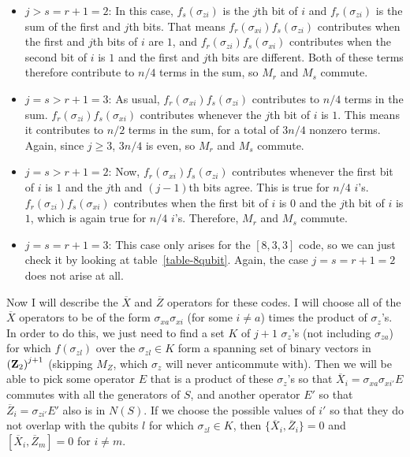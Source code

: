 \documentclass{report}
\newcommand{\Z}{\sigma_z}
\newcommand{\Xs}[1]{\sigma_{x{#1}}}
\newcommand{\Zs}[1]{\sigma_{z{#1}}}
\newcommand{\Xbar}{\overline{X}}
\newcommand{\Zbar}{\overline{Z}}
\begin{document}
\begin{itemize}
\item $j > s = r+1 = 2$: In this case, $f_s (\Zs{i})$ is the $j$th bit of $i$ 
and $f_r (\Zs{i})$ is the sum of the first and $j$th bits.  That means $f_r 
(\Xs{i}) f_s (\Zs{i})$ contributes when the first and $j$th bits of $i$ are $1$,
and $f_r (\Zs{i}) f_s (\Xs{i})$ contributes when the second bit of $i$ is $1$ 
and the first and $j$th bits are different.  Both of these terms therefore 
contribute to $n/4$ terms in the sum, so $M_r$ and $M_s$ commute.

\item $j = s > r+1 = 3$: As usual, $f_r (\Xs{i}) f_s (\Zs{i})$ contributes to 
$n/4$ terms in the sum.  $f_r (\Zs{i}) f_s (\Xs{i})$ contributes whenever the 
$j$th bit of $i$ is $1$.  This means it contributes to $n/2$ terms in the sum, 
for a total of $3n/4$ nonzero terms.  Again, since $j \geq 3$, $3n/4$ is even, 
so $M_r$ and $M_s$ commute.

\item $j = s > r+1 = 2$: Now, $f_r (\Xs{i}) f_s (\Zs{i})$ contributes whenever 
the first bit of $i$ is $1$ and the $j$th and $(j-1)$th bits agree.  This is 
true for $n/4$ $i$'s. $f_r (\Zs{i}) f_s (\Xs{i})$ contributes when the first 
bit of $i$ is 0 and the $j$th bit of $i$ is $1$, which is again true for $n/4$ 
$i$'s.  Therefore, $M_r$ and $M_s$ commute.

\item $j = s = r+1 = 3$: This case only arises for the $[8, 3, 3]$ code, so we
can just check it by looking at table~\ref{table-8qubit}.  Again, the case
$j = s = r+1 = 2$ does not arise at all.

\end{itemize}

Now I will describe the $\Xbar$ and $\Zbar$ operators for these codes.  I 
will choose all of the $\Xbar$ operators to be of the form $\Xs{a} \Xs{i}$ (for 
some $i \neq a$) times the product of $\Z$'s.  In order to do this, we just 
need to find a set $K$ of $j+1$ $\Z$'s (not including $\Zs{a}$) for which 
$f(\Zs{l})$ over the $\Zs{l} \in K$ form a spanning set of binary vectors in 
$\left({\bf Z}_2 \right)^{j+1}$ (skipping $M_Z$, which $\Z$ will never 
anticommute with).  Then we will be able to pick some operator $E$ that is 
a product of these $\Z$'s so that $\Xbar_i = \Xs{a} \Xs{i'} E$ commutes with 
all the generators of $S$, and another operator $E'$ so that $\Zbar_i = 
\Zs{i'} E'$ also is in $N(S)$. If we choose the possible values of $i'$ so that 
they do not overlap with the qubits $l$ for which $\Zs{l} \in K$, then $\{ 
\Xbar_i, \Zbar_i \} = 0$ and $[\Xbar_i, \Zbar_m] = 0$ for $i \neq m$.
\end{document}
